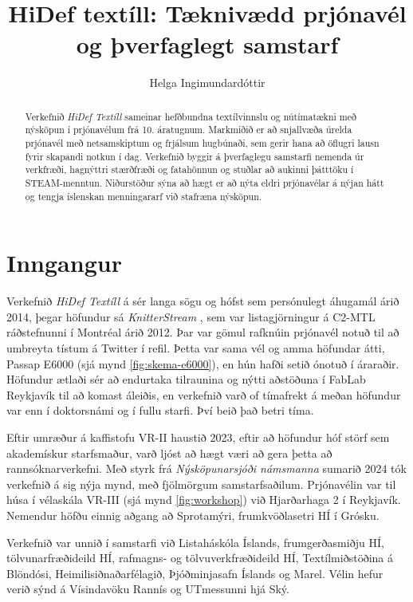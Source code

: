 \documentclass[a4paper,10pt,twocolumn]{article}
\title{HiDef textíll: Tæknivædd prjónavél og þverfaglegt samstarf}
\author{Helga Ingimundardóttir}
\date{}
\begin{document}
\maketitle

\begin{abstract}
Verkefnið \emph{HiDef Textíll} sameinar hefðbundna textílvinnslu og nútímatækni með
nýsköpun í prjónavélum frá 10. áratugnum. Markmiðið er að snjallvæða úrelda prjónavél
með netsamskiptum og frjálsum hugbúnaði, sem gerir hana að öflugri lausn fyrir
skapandi notkun í dag. Verkefnið byggir á þverfaglegu samstarfi nemenda úr verkfræði,
hagnýttri stærðfræði og fatahönnun og stuðlar að aukinni þátttöku í STEAM-menntun.
Niðurstöður sýna að hægt er að nýta eldri prjónavélar á nýjan hátt og tengja íslenskan
menningararf við stafræna nýsköpun.
\end{abstract}

\section{Inngangur}
Verkefnið \emph{HiDef Textíll} á sér langa sögu og hófst sem persónulegt áhugamál 
árið 2014, þegar höfundur sá \emph{KnitterStream} \cite{knitterstream}, sem var 
listagjörningur á C2-MTL ráðstefnunni í Montréal árið 2012. Þar var gömul rafknúin 
prjónavél notuð til að umbreyta tístum á Twitter í refil. Þetta var sama vél og 
amma höfundar átti, Passap E6000 (sjá mynd \ref{fig:skema-e6000}), en hún hafði setið 
ónotuð í áraraðir. Höfundur ætlaði sér að endurtaka tilraunina og nýtti aðstöðuna 
í FabLab Reykjavík til að komast áleiðis, en verkefnið varð of tímafrekt á meðan 
höfundur var enn í doktorsnámi og í fullu starfi. Því beið það betri tíma.

Eftir umræður á kaffistofu VR-II haustið 2023, eftir að höfundur hóf störf sem 
akademískur starfsmaður, varð ljóst að hægt væri að gera þetta að rannsóknarverkefni. 
Með styrk frá \emph{Nýsköpunarsjóði námsmanna} sumarið 2024 tók verkefnið á sig nýja 
mynd, með fjölmörgum samstarfsaðilum. Prjónavélin var til húsa í vélaskála VR-III 
(sjá mynd \ref{fig:workshop}) við Hjarðarhaga 2 í Reykjavík. Nemendur höfðu einnig 
aðgang að Sprotamýri, frumkvöðlasetri HÍ í Grósku.

Verkefnið var unnið í samstarfi við Listaháskóla Íslands, frumgerðasmiðju HÍ, 
tölvunarfræðideild HÍ, rafmagns- og tölvuverkfræðideild HÍ, Textílmiðstöðina á 
Blöndósi, Heimilisiðnaðarfélagið, Þjóðminjasafn Íslands og Marel. Vélin hefur verið 
sýnd á Vísindavöku Rannís og UTmessunni hjá Ský. 
\end{document}
